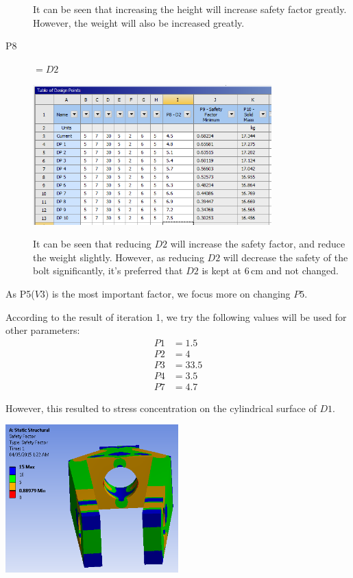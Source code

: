 \documentclass[a4paper,14pt]{extarticle}
\newcommand{\cm}{\,\si{\centi\meter}}
\begin{document}
\begin{description}
It can be seen that increasing the height will increase safety factor greatly. However, the weight will also be increased greatly.
\item[P8] $=D2$

\includegraphics[width=0.75\textwidth]{singleParam/P8.PNG}

It can be seen that reducing $D2$ will increase the safety factor, and reduce the weight slightly. However, as reducing $D2$ will decrease the safety of the bolt significantly, it's preferred that $D2$ is kept at $6\cm$ and not changed.
\end{description}

As P5($V3$) is the most important factor, we focus more on changing $P5$.

According to the result of iteration 1, we try the following values will be used for other parameters:
\begin{align*}
P1 &= 1.5\\
P2 &= 4\\
P3 &= 33.5\\
P4 &= 3.5\\
P7 &= 4.7
\end{align*}

However, this resulted to stress concentration on the cylindrical surface of $D1$. 

\begin{center}
\includegraphics[width=0.5\textwidth]{REF3.PNG}
\end{center}
\end{document}
